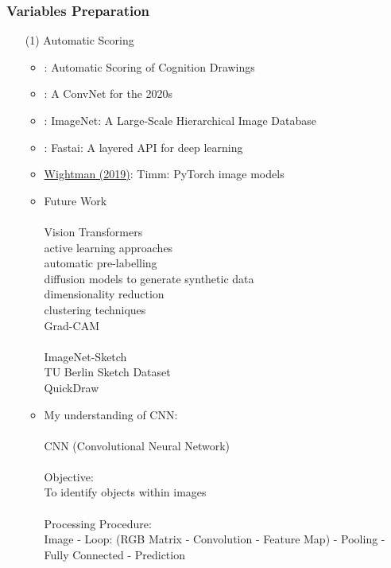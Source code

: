\documentclass[12pt]{article}
\begin{document}
\subsubsection{Variables Preparation}
\begin{itemize}
    \item[(1)] Automatic Scoring
    \begin{itemize}
        \item \cite{bethmann2023automatic}: Automatic Scoring of Cognition Drawings
        \item \cite{liu2022convnet}: A ConvNet for the 2020s
        \item \cite{deng2009imagenet}: ImageNet: A Large-Scale Hierarchical Image Database
        \item \cite{howard2020fastai}: Fastai: A layered API for deep learning
        \item \href{https://github.com/huggingface/pytorch-image-models}{Wightman (2019)}: Timm: PyTorch image models
        \item Future Work \\
        \\
        Vision Transformers \\
        active learning approaches \\
        automatic pre-labelling \\
        diffusion models to generate synthetic data \\
        dimensionality reduction \\
        clustering techniques \\
        Grad-CAM \\
        \\
        ImageNet-Sketch \\
        TU Berlin Sketch Dataset \\
        QuickDraw 
        \item My understanding of CNN: \\
        \\
        CNN (Convolutional Neural Network) \\
        \\
        Objective: \\
        To identify objects within images \\
        \\
        Processing Procedure: \\
        Image - Loop: (RGB Matrix - Convolution - Feature Map) - Pooling - Fully Connected - Prediction \\

\end{itemize}
\end{itemize}
\end{document}
